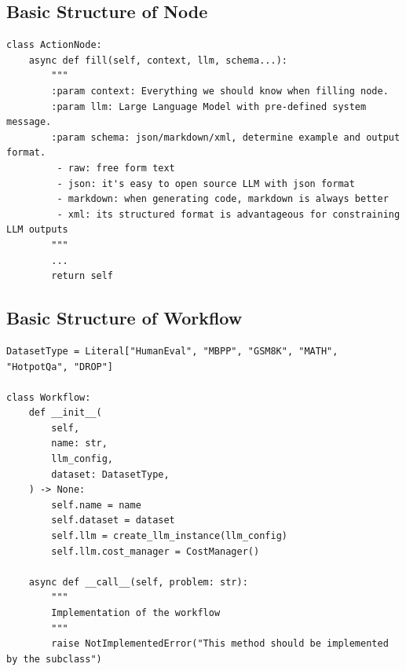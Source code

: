\documentclass{article} %
\theoremstyle{plain}
\theoremstyle{definition}
\theoremstyle{remark}
\begin{document}
\subsection{Basic Structure of Node}
\label{appendix:node structure}
\begin{tcolorbox}[title={\textbf{\small Node structure}}, boxrule=1pt, arc=0mm, colback=black!5!white, colframe=black!75!white, breakable, before skip=10pt, after skip=10pt, pad at break=2mm, parbox=false] \begin{verbatim}
class ActionNode:
    async def fill(self, context, llm, schema...):
        """
        :param context: Everything we should know when filling node.
        :param llm: Large Language Model with pre-defined system message.
        :param schema: json/markdown/xml, determine example and output format.
         - raw: free form text
         - json: it's easy to open source LLM with json format
         - markdown: when generating code, markdown is always better
         - xml: its structured format is advantageous for constraining LLM outputs
        """
        ...
        return self
\end{verbatim}
\end{tcolorbox}

\subsection{Basic Structure of Workflow}
\label{appendix:graph structure}
\begin{tcolorbox}[title={\textbf{\small Workflow structure}}, boxrule=1pt, arc=0mm, colback=black!5!white, colframe=black!75!white, breakable, before skip=10pt, after skip=10pt, pad at break=2mm, parbox=false] \begin{verbatim}
DatasetType = Literal["HumanEval", "MBPP", "GSM8K", "MATH", "HotpotQa", "DROP"]

class Workflow:
    def __init__(
        self,
        name: str,
        llm_config,
        dataset: DatasetType,
    ) -> None:
        self.name = name
        self.dataset = dataset
        self.llm = create_llm_instance(llm_config)
        self.llm.cost_manager = CostManager()

    async def __call__(self, problem: str):
        """
        Implementation of the workflow
        """
        raise NotImplementedError("This method should be implemented by the subclass")
\end{verbatim}
\end{tcolorbox}
\end{document}
